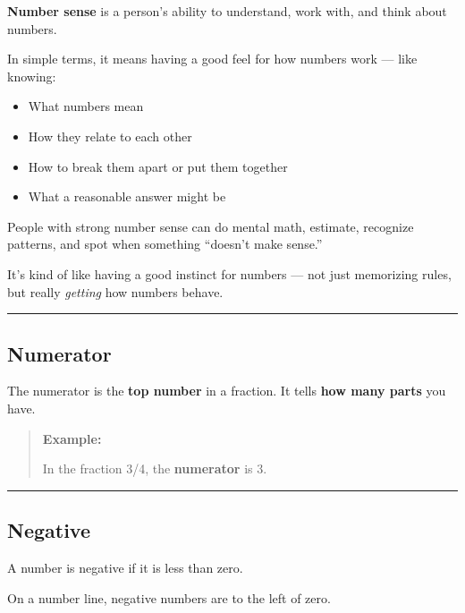 \documentclass[
  letterpaper,
  DIV=11,
  numbers=noendperiod]{scrreprt}
\providecommand{\tightlist}{%
  \setlength{\itemsep}{0pt}\setlength{\parskip}{0pt}}
\begin{document}
\textbf{Number sense} is a person's ability to understand, work with,
and think about numbers.

In simple terms, it means having a good feel for how numbers work ---
like knowing:

\begin{itemize}
\tightlist
\item
  What numbers mean
\item
  How they relate to each other
\item
  How to break them apart or put them together
\item
  What a reasonable answer might be
\end{itemize}

People with strong number sense can do mental math, estimate, recognize
patterns, and spot when something ``doesn't make sense.''

It's kind of like having a good instinct for numbers --- not just
memorizing rules, but really \emph{getting} how numbers behave.

\begin{center}\rule{0.5\linewidth}{0.5pt}\end{center}

\subsection*{Numerator}\label{glossary-numerator}

The numerator is the \textbf{top number} in a fraction. It tells
\textbf{how many parts} you have.

\begin{quote}
\textbf{Example:}

In the fraction 3/4, the \textbf{numerator} is 3.
\end{quote}

\begin{center}\rule{0.5\linewidth}{0.5pt}\end{center}

\subsection*{Negative}\label{glossary-negative}

A number is negative if it is less than zero.

On a number line, negative numbers are to the left of zero.
\end{document}
